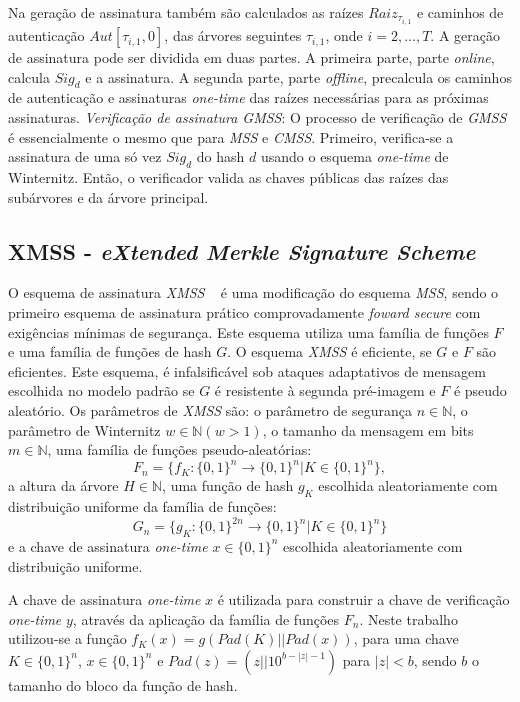 \documentclass{SBCbookchapter}
\begin{document}
\begin{otherlanguage}{brazilian}
Na geração de assinatura também são calculados as raízes $Raiz_{\tau_{i,1}}$ e caminhos de autenticação $Aut[\tau_{i,1},0]$, das árvores seguintes $\tau_{i,1}$, onde $ i = 2,..., T$. 
A geração de assinatura pode ser dividida em duas partes. A primeira parte, parte \textit{online}, calcula $Sig_d$ e a assinatura. A segunda parte, parte \textit{offline}, precalcula os caminhos de autenticação e assinaturas \textit{one-time} das raízes necessárias para as próximas assinaturas. 
\newline \newline \textit{Verificação de assinatura GMSS}: O processo de verificação de \textit{GMSS} é essencialmente o mesmo que para \textit{MSS} e \textit{CMSS}. Primeiro, verifica-se a assinatura de uma só vez $Sig_d$ do hash $d$ usando o esquema \textit{one-time} de Winternitz. Então, o verificador valida as chaves públicas das raízes das subárvores e da árvore principal.

\subsection{XMSS - \textit{eXtended Merkle Signature Scheme}}
O esquema de assinatura \textit{XMSS} ~\cite{bucm:11} é uma modificação do esquema \textit{MSS}, sendo o primeiro esquema de assinatura prático comprovadamente \textit{foward secure} com exigências mínimas de segurança. %
Este esquema utiliza uma família de funções $F$ e uma família de funções de hash $G$. O esquema \textit{XMSS} é eficiente, se $G$ e $F$ são eficientes. 
Este esquema, é infalsificável sob ataques adaptativos de mensagem escolhida no modelo padrão se $G$ é resistente à segunda pré-imagem e $F$ é pseudo aleatório.
Os parâmetros de \textit{XMSS} são: o parâmetro de segurança $n \in \mathbb{N}$, o parâmetro de Winternitz $w \in \mathbb{N} (w > 1)$, 
o tamanho da mensagem em bits $m \in \mathbb{N}$, uma família de funções pseudo-aleatórias:
\[
F_n = \{f_K : \{0, 1\}^n \to \{0, 1\}^n |K \in \{0, 1\}^n \},  
\]
a altura da árvore $H \in \mathbb{N}$, uma função de hash $g_K$ escolhida aleatoriamente com distribuição uniforme da família de funções:
\[
G_n = \{g_K : \{0, 1\}^{2n} \to \{0, 1\}^n |K \in \{0, 1\}^n \}
\]
e a chave de assinatura \textit{one-time} $x \in \{0, 1\}^n$ escolhida aleatoriamente com distribuição uniforme. 

A chave de assinatura \textit{one-time} $x$ é utilizada para construir a chave de verificação \textit{one-time} $y$, através da aplicação da família de funções $F_n$. 
Neste trabalho utilizou-se a função $f_K(x)=g(Pad(K)||Pad(x))$, para uma chave $K \in \{0,1\}^n$, $x \in \{0,1\}^n$ e 
$Pad(z)=(z||10^{b-|z|-1})$ para $|z|<b$, sendo $b$ o tamanho do bloco da função de hash.


\end{otherlanguage}
\end{document}
